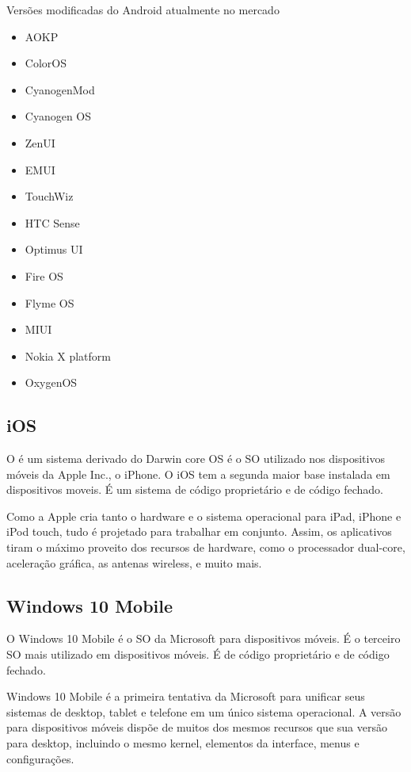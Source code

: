\begin{small}
	\begin{description}
	    \item[Versões modificadas do Android atualmente no mercado]
	\end{description}\vspace{-7mm}
	\begin{itemize}
		\item AOKP
	    \item ColorOS
	    \item CyanogenMod
	    \item Cyanogen OS
	    \item ZenUI
	    \item EMUI
	    \item TouchWiz
	    \item HTC Sense
	    \item Optimus UI
	    \item Fire OS
	    \item Flyme OS
	    \item MIUI
	    \item Nokia X platform
	    \item OxygenOS
	\end{itemize}
\end{small}

\subsection{iOS}
O  é um sistema derivado do Darwin core OS é o SO utilizado nos dispositivos móveis da Apple Inc., o iPhone. O iOS tem a segunda maior base instalada em dispositivos moveis. É um sistema de código proprietário e de código fechado.
\begin{citacao}
Como a Apple cria tanto o hardware e o sistema operacional para iPad, iPhone e iPod touch, tudo é projetado para trabalhar em conjunto. Assim, os aplicativos tiram o máximo proveito dos recursos de hardware, como o processador dual-core, aceleração gráfica, as antenas wireless, e muito mais. \cite{aboutios}
\end{citacao}

\subsection{Windows 10 Mobile}
O Windows 10 Mobile é o SO da Microsoft para dispositivos móveis. É o terceiro SO mais utilizado em dispositivos móveis. É de código proprietário e de código fechado.
\begin{citacao}
Windows 10 Mobile é a primeira tentativa da Microsoft para unificar seus sistemas de desktop, tablet e telefone em um único sistema operacional. A versão para dispositivos móveis dispõe de muitos dos mesmos recursos que sua versão para desktop, incluindo o mesmo kernel, elementos da interface, menus e configurações. \cite{aboutwindows}
\end{citacao}
